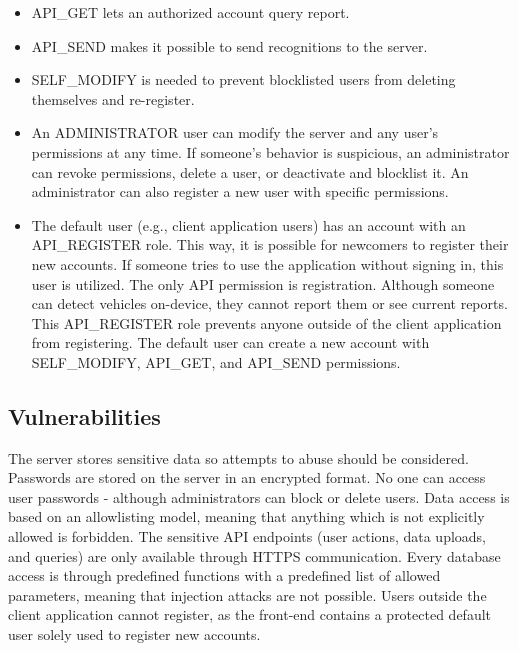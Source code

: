 \begin{itemize}
\item API\_GET lets an authorized account query report.
\item API\_SEND makes it possible to send recognitions to the server.
\item SELF\_MODIFY is needed to prevent blocklisted users from deleting themselves and re-register.
\item An ADMINISTRATOR user can modify the server and any user's permissions at any time. If someone's behavior is suspicious, an administrator can revoke permissions, delete a user, or deactivate and blocklist it. An administrator can also register a new user with specific permissions.
\item The default user (e.g., client application users) has an account with an API\_REGISTER role. This way, it is possible for newcomers to register their new accounts. If someone tries to use the application without signing in, this user is utilized. The only API permission is registration. Although someone can detect vehicles on-device, they cannot report them or see current reports. This API\_REGISTER role prevents anyone outside of the client application from registering. The default user can create a new account with SELF\_MODIFY, API\_GET, and API\_SEND permissions.
\end{itemize}

\subsection{Vulnerabilities}

The server stores sensitive data so attempts to abuse should be considered. Passwords are stored on the server in an encrypted format. No one can access user passwords - although administrators can block or delete users. Data access is based on an allowlisting model, meaning that anything which is not explicitly allowed is forbidden. The sensitive API endpoints (user actions, data uploads, and queries) are only available through HTTPS communication. Every database access is through predefined functions with a predefined list of allowed parameters, meaning that injection attacks are not possible. Users outside the client application cannot register, as the front-end contains a protected default user solely used to register new accounts. 

